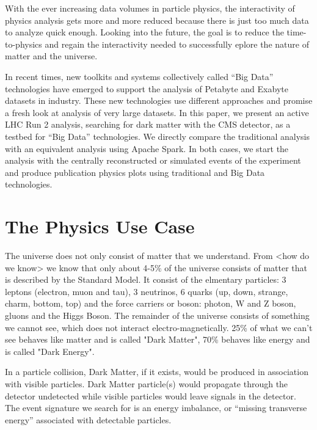 \documentclass[a4paper]{jpconf}
\begin{document}
With the ever increasing data volumes in particle physics, the interactivity of physics analysis gets more and more reduced because there is just too much data to analyze quick enough. Looking into the future, the goal is to reduce the time-to-physics and regain the interactivity needed to successfully eplore the nature of matter and the universe.

In recent times, new toolkits and systems collectively called “Big Data” technologies have emerged to support the analysis of Petabyte and Exabyte datasets in industry. These new technologies use different approaches and promise a fresh look at analysis of very large datasets. In this paper, we present an active LHC Run 2 analysis, searching for dark matter with the CMS detector, as a testbed for “Big Data” technologies. We directly compare the traditional analysis with an equivalent analysis using Apache Spark. In both cases, we start the analysis with the centrally reconstructed or simulated events of the experiment and produce publication physics plots using traditional and Big Data technologies. 

\section{The Physics Use Case}

The universe does not only consist of matter that we understand. From <how do we know> we know that only about 4-5\% of the universe consists of matter that is described by the Standard Model. It consist of the elmentary particles: 3 leptons (electron, muon and tau), 3 neutrinos, 6 quarks (up, down, strange, charm, bottom, top) and the force carriers or boson: photon, W and Z boson, gluons and the Higgs Boson. The remainder of the universe consists of something we cannot see, which does not interact electro-magnetically. 25\% of what we can't see behaves like matter and is called "Dark Matter", 70\% behaves like energy and is called "Dark Energy". 

In a particle collision, Dark Matter, if it exists, would be produced in association with visible particles. Dark Matter particle(s) would propagate through the detector undetected while visible particles would leave signals in the detector. The event signature we search for is an energy imbalance, or “missing transverse energy” associated with detectable particles.
\end{document}
